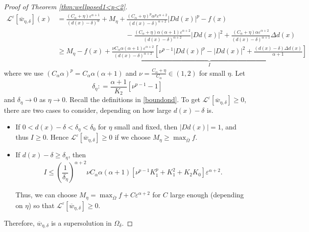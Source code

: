 \documentclass[12pt,reqno]{amsart}
\numberwithin{figure}{section}
\theoremstyle{plain}
\theoremstyle{remark}
\numberwithin{equation}{section}
\begin{document}
\begin{proof} [Proof of Theorem \ref{thm:wellposed1<p<2}]
\begin{align*}
    \mathcal{L}^\varepsilon\left[\overline{w}_{\eta,\delta}\right](x) &= \frac{ (C_\alpha + \eta)\varepsilon^{\alpha+1}}{(d(x)-\delta)^\alpha} + M_\eta + \frac{(C_\alpha+\eta)^p \alpha^p\varepsilon^{\alpha+2}}{(d(x)-\delta)^{\alpha+2}}|D d(x)|^p - f(x) \\
    & \qquad\qquad\qquad\qquad\qquad - \frac{(C_\alpha+\eta)\alpha(\alpha+1)\varepsilon^{\alpha+2}}{(d(x)-\delta)^{\alpha+2}}|D d(x)|^2 + \frac{(C_\alpha+\eta)\alpha \varepsilon^{\alpha+2}}{(d(x)-\delta)^{\alpha+1}}\Delta d(x)\\
    &\geq M_\eta - f(x) + \underbrace{\frac{\nu C_\alpha\alpha(\alpha+1)\varepsilon^{\alpha+2}}{(d(x)-\delta)^{\alpha+2}}\left[\nu^{p-1}|Dd(x)|^{p} - |Dd(x)|^2 + \frac{(d(x)-\delta)\Delta d(x)}{\alpha+1}\right]}_{I}
\end{align*}
where we use $(C_\alpha\alpha)^p = C_\alpha\alpha(\alpha+1)$ and $\nu = \frac{C_\alpha+\eta}{C_\alpha} \in (1,2)$ for small $\eta$. Let
\begin{equation*}
    \delta_\eta : = \frac{\alpha+1}{K_2}\left[\nu^{p-1}-1\right]
\end{equation*}
and $\delta_\eta \to 0$ as $\eta \to 0$.
Recall the definitions in \eqref{boundond}. To get  $\mathcal{L}^\varepsilon\left[\overline{w}_{\eta,\delta}\right]\geq 0$, there are two cases to consider, depending on how large $d(x)-\delta$ is.
\begin{itemize}
    \item If $0< d(x)-\delta <\delta_\eta < \delta_0$ for $\eta$ small and fixed, then $|Dd(x)| = 1$, and thus $I\geq 0$. Hence $\mathcal{L}^\varepsilon\left[\overline{w}_{\eta,\delta}\right]\geq 0$ if we choose $M_\eta \geq \max_{\overline{\Omega}} f$.
    \item If $d(x)-\delta\geq \delta_\eta$, then 
    \begin{equation*}
        I \leq \left(\frac{1}{\delta_\eta}\right)^{\alpha+2}\nu C_\alpha \alpha(\alpha+1)\left[\nu^{p-1}K_1^{p}+K_1^2+K_2K_0\right]\varepsilon^{\alpha+2}.
    \end{equation*}
    
    Thus, we can choose $M_\eta = \max_{\overline{\Omega}} f + C\varepsilon^{\alpha+2}$ for $C$ large enough (depending on $\eta$) so that  $\mathcal{L}^\varepsilon\left[\overline{w}_{\eta,\delta}\right]\geq 0$.
\end{itemize}
Therefore, $\overline{w}_{\eta,\delta}$ is a supersolution in $\Omega_\delta$. 


\end{proof}
\end{document}
